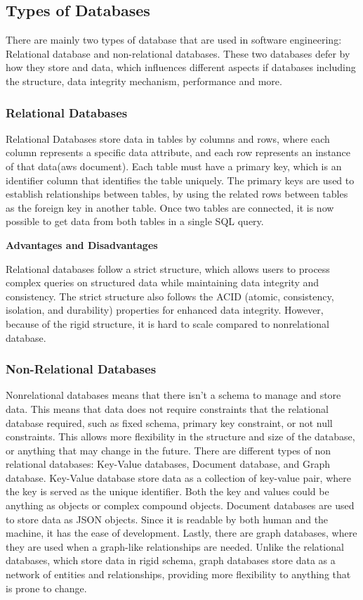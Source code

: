 \subsection[Types of Databases]{Types of Databases}
There are mainly two types of database that are used in software engineering: Relational database and non-relational databases. 
These two databases defer by how they store and data, which influences different aspects if databases including the structure, data integrity mechanism, performance and more. 

\subsubsection[Relational Databases]{Relational Databases}
Relational Databases store data in tables by columns and rows, where each column represents a specific data attribute, 
and each row represents an instance of that data(aws document). Each table must have a primary key, which is an identifier column that identifies the table uniquely.
The primary keys are used to establish relationships between tables, by using the related rows between tables as the foreign key in another table. 
Once two tables are connected, it is now possible to get data from both tables in a single SQL query.

\noindent \textbf{Advantages and Disadvantages}

Relational databases follow a strict structure, which allows users to process complex queries on structured data while maintaining data integrity and consistency. 
The strict structure also follows the ACID (atomic, consistency, isolation, and durability) properties for enhanced data integrity. 
However, because of the rigid structure, it is hard to scale compared to nonrelational database.  

\subsubsection[Non-Relational Databases]{Non-Relational Databases}
Nonrelational databases means that there isn’t a schema to manage and store data. 
This means that data does not require constraints that the relational database required, such as fixed schema, primary key constraint, or not null constraints. 
This allows more flexibility in the structure and size of the database, or anything that may change in the future. 
There are different types of non relational databases: Key-Value databases, Document database, and Graph database. 
Key-Value database store data as a collection of key-value pair, where the key is served as the unique identifier. 
Both the key and values could be anything as objects or complex compound objects. Document databases are used to store data as JSON objects. 
Since it is readable by both human and the machine, it has the ease of development. Lastly, there are graph databases, 
where they are used when a graph-like relationships are needed. Unlike the relational databases, which store data in rigid schema, 
graph databases store data as a network of entities and relationships, providing more flexibility to anything that is prone to change. 


